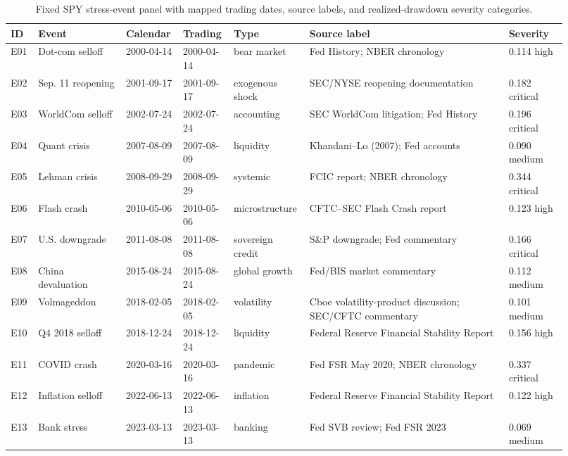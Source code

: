\documentclass[10pt,twocolumn]{article}
\begin{document}
\begin{table}[t]
\centering
\caption{Fixed SPY stress-event panel with mapped trading dates, source labels, and realized-drawdown severity categories.}
\label{tab:events}
\scriptsize
\setlength{\tabcolsep}{2pt}
\begin{tabular}{p{0.045\linewidth}p{0.15\linewidth}p{0.085\linewidth}p{0.085\linewidth}p{0.105\linewidth}p{0.34\linewidth}p{0.105\linewidth}}
\toprule
ID & Event & Calendar & Trading & Type & Source label & Severity \\
\midrule
E01 & Dot-com selloff & 2000-04-14 & 2000-04-14 & bear market & Fed History; NBER chronology & 0.114 high\\
E02 & Sep. 11 reopening & 2001-09-17 & 2001-09-17 & exogenous shock & SEC/NYSE reopening documentation & 0.182 critical\\
E03 & WorldCom selloff & 2002-07-24 & 2002-07-24 & accounting & SEC WorldCom litigation; Fed History & 0.196 critical\\
E04 & Quant crisis & 2007-08-09 & 2007-08-09 & liquidity & Khandani--Lo (2007); Fed accounts & 0.090 medium\\
E05 & Lehman crisis & 2008-09-29 & 2008-09-29 & systemic & FCIC report; NBER chronology & 0.344 critical\\
E06 & Flash crash & 2010-05-06 & 2010-05-06 & microstructure & CFTC--SEC Flash Crash report & 0.123 high\\
E07 & U.S. downgrade & 2011-08-08 & 2011-08-08 & sovereign credit & S\&P downgrade; Fed commentary & 0.166 critical\\
E08 & China devaluation & 2015-08-24 & 2015-08-24 & global growth & Fed/BIS market commentary & 0.112 medium\\
E09 & Volmageddon & 2018-02-05 & 2018-02-05 & volatility & Cboe volatility-product discussion; SEC/CFTC commentary & 0.101 medium\\
E10 & Q4 2018 selloff & 2018-12-24 & 2018-12-24 & liquidity & Federal Reserve Financial Stability Report & 0.156 high\\
E11 & COVID crash & 2020-03-16 & 2020-03-16 & pandemic & Fed FSR May 2020; NBER chronology & 0.337 critical\\
E12 & Inflation selloff & 2022-06-13 & 2022-06-13 & inflation & Federal Reserve Financial Stability Report & 0.122 high\\
E13 & Bank stress & 2023-03-13 & 2023-03-13 & banking & Fed SVB review; Fed FSR 2023 & 0.069 medium\\
\bottomrule
\end{tabular}
\end{table}
\end{document}
